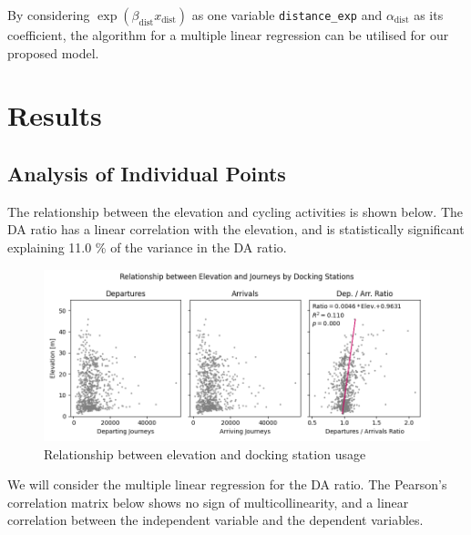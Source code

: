 \documentclass[
  12pt,
  a4paper,
  DIV=11,
  numbers=noendperiod]{scrartcl}
\begin{document}
By considering \(\exp(\beta_\text{dist} x_\text{dist})\) as one variable
\texttt{distance\_exp} and \(\alpha_\text{dist}\) as its coefficient,
the algorithm for a multiple linear regression can be utilised for our
proposed model.

\hypertarget{results}{%
\section{Results}\label{results}}

\hypertarget{analysis-of-individual-points}{%
\subsection{Analysis of Individual
Points}\label{analysis-of-individual-points}}

The relationship between the elevation and cycling activities is shown
below. The DA ratio has a linear correlation with the elevation, and is
statistically significant explaining 11.0 \% of the variance in the DA
ratio.

\begin{figure}

{\centering \includegraphics{img/elev_scatter.png}

}

\caption{Relationship between elevation and docking station usage}

\end{figure}

We will consider the multiple linear regression for the DA ratio. The
Pearson's correlation matrix below shows no sign of multicollinearity,
and a linear correlation between the independent variable and the
dependent variables.
\end{document}
